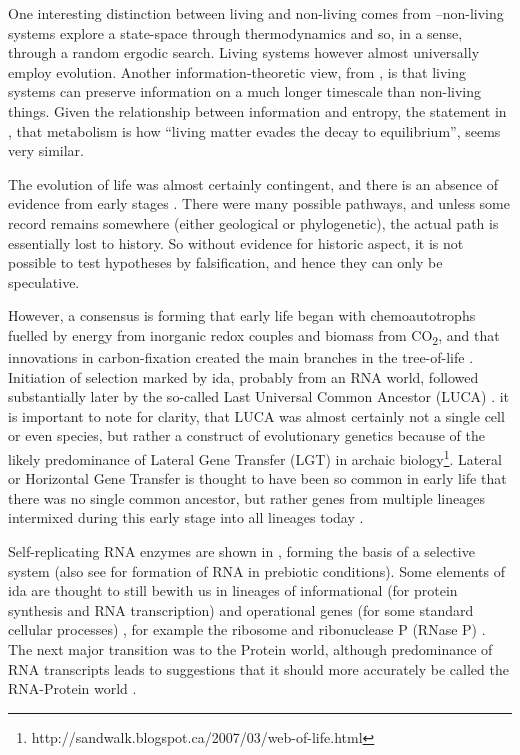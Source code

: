One interesting distinction between living and non-living comes from \textcite{Rasmussen2004}--non-living systems explore a state-space through thermodynamics and so, in a sense, through a random ergodic search. Living systems however almost universally employ evolution. Another information-theoretic view, from \textcite{Adami2015}, is that living systems can preserve information on a much longer timescale than non-living things. Given the relationship between information and entropy, the statement in \textcite{Schrodinger1944}, that metabolism is how ``living matter evades the decay to equilibrium'', seems very similar.

\begin{mdframed}[style=box, frametitle={The orgins of life}]

The evolution of life was almost certainly contingent, and there is an absence of evidence from early stages \parencite{Pross2013}. There were many possible pathways, and unless some record remains somewhere (either geological or phylogenetic), the actual path is essentially lost to history. So without evidence for historic aspect, it is not possible to test hypotheses by falsification, and hence they can only be speculative.

However, a consensus is forming that early life began with chemoautotrophs fuelled by energy from inorganic redox couples and biomass from CO\textsubscript{2}, and that innovations in carbon-fixation created the main branches in the tree-of-life \parencite{Braakman2012}. Initiation of selection marked by \gls{ida}, probably from an RNA world, followed substantially later by  the so-called Last Universal Common Ancestor (LUCA) \parencite{Yarus2011}. it is important to note for clarity, that LUCA was almost certainly not a single cell or even species, but rather a construct of evolutionary genetics because of the likely predominance of Lateral Gene Transfer (LGT) in archaic biology\footnote{http://sandwalk.blogspot.ca/2007/03/web-of-life.html}. Lateral or Horizontal Gene Transfer is thought to have been so common in early life that there was no single common ancestor, but rather genes from multiple lineages intermixed during this early stage into all lineages today \parencite{Ragan2009}.

Self-replicating RNA enzymes are shown in \textcite{Lincoln2009}, forming the basis of a selective system  (also see \textcite{Cheng2010,Powner2009} for formation of RNA in prebiotic conditions). Some elements of \gls{ida}  are thought to still bewith us in lineages of informational (for protein synthesis and RNA transcription) and operational genes (for some standard cellular processes) \parencite{Ragan2009}, for example the ribosome and ribonuclease P (RNase P) \parencite{Wilson2009}. The next major transition was to the Protein world, although predominance of RNA transcripts leads to suggestions that it should more accurately be called the RNA-Protein world \parencite{Altman2013}.


\end{mdframed}

